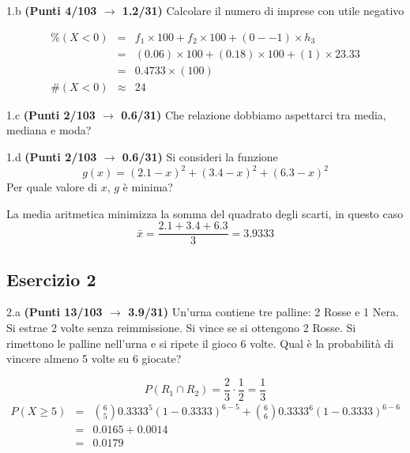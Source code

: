 \documentclass[
  11pt,
]{book}
\theoremstyle{mytheoremstyle}
\theoremstyle{mydefstyle}
\newenvironment{sol}
  {
  \begin{tcolorbox}[enhanced,breakable,arc=0.1mm,boxrule=1pt,colback=white,colframe=iblue,
  title=\bf \fontfamily{lmss}\selectfont \hspace{.5 cm} Soluzione,drop fuzzy shadow]

}{
\end{tcolorbox}
  }
\begin{document}
1.b \textbf{(Punti 4/103 \(\rightarrow\) 1.2/31)} Calcolare il numero di imprese con utile negativo

\begin{sol}
\begin{eqnarray*}
     \%(X< 0 ) &=&  f_{ 1 }\times 100+f_{ 2 }\times 100 +( 0 - -1 )\times h_{ 3 } \\
              &=&  ( 0.06 )\times 100+( 0.18 )\times 100 +( 1 )\times  23.33  \\
              &=&  0.4733 \times(100) \\
     \#(X< 0 ) &\approx& 24 
         \end{eqnarray*}

\end{sol}

1.c \textbf{(Punti 2/103 \(\rightarrow\) 0.6/31)} Che relazione dobbiamo aspettarci tra media, mediana e moda?

1.d \textbf{(Punti 2/103 \(\rightarrow\) 0.6/31)} Si consideri la funzione
\[
g(x) = (2.1-x)^2+(3.4-x)^2+(6.3-x)^2
\]
Per quale valore di \(x\), \(g\) è minima?

\begin{sol}
La media aritmetica minimizza la somma del quadrato degli scarti, in questo caso
\[
\bar x = \frac{2.1+3.4+6.3}{3}=3.9333
\]

\end{sol}

\subsection{Esercizio 2}\label{esercizio-2-50}

2.a \textbf{(Punti 13/103 \(\rightarrow\) 3.9/31)} Un'urna contiene tre palline: 2 Rosse e 1 Nera. Si estrae 2 volte senza reimmissione.
Si vince se si ottengono 2 Rosse. Si rimettono le palline nell'urna e si ripete il gioco 6 volte.
Qual è la probabilità di vincere almeno 5 volte su 6 giocate?

\begin{sol}
\[
P(R_1\cap R_2)=\frac 23\cdot\frac 12 = \frac 13
\]
\normalsize 
\begin{eqnarray*}
      P( X \geq 5 ) &=& \binom{ 6 }{ 5 } 0.3333 ^{ 5 }(1- 0.3333 )^{ 6 - 5 }+\binom{ 6 }{ 6 } 0.3333 ^{ 6 }(1- 0.3333 )^{ 6 - 6 } \\                 &=& 0.0165+0.0014 \\                 &=& 0.0179 
   \end{eqnarray*}
\normalsize 

\end{sol}
\end{document}
